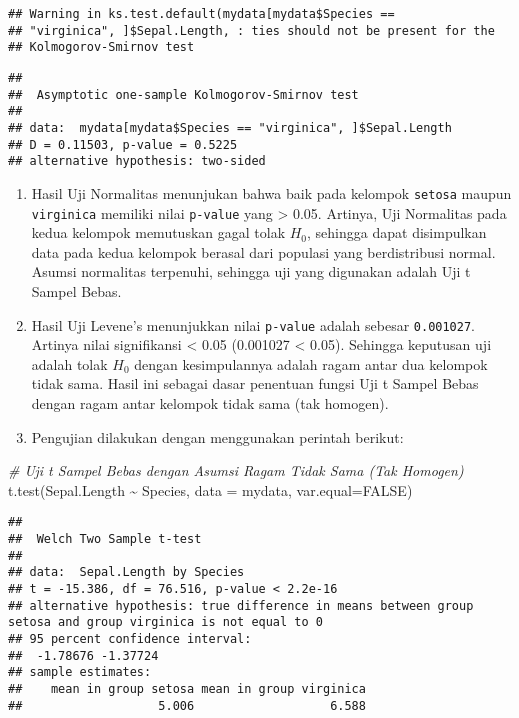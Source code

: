 \documentclass[
]{book}
\newenvironment{Shaded}{\begin{snugshade}}{\end{snugshade}}
\newcommand{\AttributeTok}[1]{\textcolor[rgb]{0.77,0.63,0.00}{#1}}
\newcommand{\CommentTok}[1]{\textcolor[rgb]{0.56,0.35,0.01}{\textit{#1}}}
\newcommand{\ConstantTok}[1]{\textcolor[rgb]{0.00,0.00,0.00}{#1}}
\newcommand{\FunctionTok}[1]{\textcolor[rgb]{0.00,0.00,0.00}{#1}}
\newcommand{\NormalTok}[1]{#1}
\newcommand{\SpecialCharTok}[1]{\textcolor[rgb]{0.00,0.00,0.00}{#1}}
\begin{document}
\begin{verbatim}
## Warning in ks.test.default(mydata[mydata$Species ==
## "virginica", ]$Sepal.Length, : ties should not be present for the
## Kolmogorov-Smirnov test
\end{verbatim}

\begin{verbatim}
## 
##  Asymptotic one-sample Kolmogorov-Smirnov test
## 
## data:  mydata[mydata$Species == "virginica", ]$Sepal.Length
## D = 0.11503, p-value = 0.5225
## alternative hypothesis: two-sided
\end{verbatim}

\begin{enumerate}
\def\labelenumi{\arabic{enumi}.}
\setcounter{enumi}{3}
\item
  Hasil Uji Normalitas menunjukan bahwa baik pada kelompok \texttt{setosa} maupun \texttt{virginica} memiliki nilai \texttt{p-value} yang \textgreater{} 0.05. Artinya, Uji Normalitas pada kedua kelompok memutuskan gagal tolak \(H_0\), sehingga dapat disimpulkan data pada kedua kelompok berasal dari populasi yang berdistribusi normal. Asumsi normalitas terpenuhi, sehingga uji yang digunakan adalah Uji t Sampel Bebas.
\item
  Hasil Uji Levene's menunjukkan nilai \texttt{p-value} adalah sebesar \texttt{0.001027}. Artinya nilai signifikansi \textless{} 0.05 (0.001027 \textless{} 0.05). Sehingga keputusan uji adalah tolak \(H_0\) dengan kesimpulannya adalah ragam antar dua kelompok tidak sama. Hasil ini sebagai dasar penentuan fungsi Uji t Sampel Bebas dengan ragam antar kelompok tidak sama (tak homogen).
\item
  Pengujian dilakukan dengan menggunakan perintah berikut:
\end{enumerate}

\begin{Shaded}
\begin{Highlighting}[]
\CommentTok{\# Uji t Sampel Bebas dengan Asumsi Ragam Tidak Sama (Tak Homogen)}
\FunctionTok{t.test}\NormalTok{(Sepal.Length }\SpecialCharTok{\textasciitilde{}}\NormalTok{ Species, }\AttributeTok{data =}\NormalTok{ mydata, }\AttributeTok{var.equal=}\ConstantTok{FALSE}\NormalTok{)}
\end{Highlighting}
\end{Shaded}

\begin{verbatim}
## 
##  Welch Two Sample t-test
## 
## data:  Sepal.Length by Species
## t = -15.386, df = 76.516, p-value < 2.2e-16
## alternative hypothesis: true difference in means between group setosa and group virginica is not equal to 0
## 95 percent confidence interval:
##  -1.78676 -1.37724
## sample estimates:
##    mean in group setosa mean in group virginica 
##                   5.006                   6.588
\end{verbatim}
\end{document}
